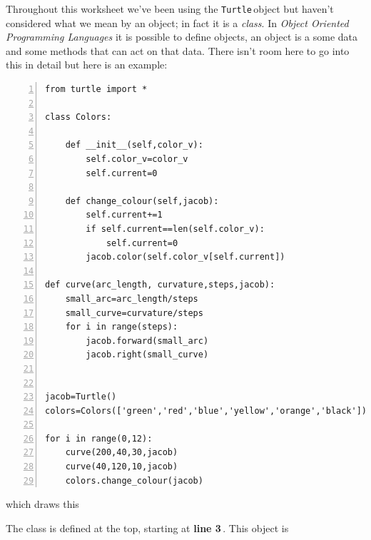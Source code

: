 \documentclass[11pt,a4paper]{scrartcl}
\newcommand{\turtle}{\texttt{Turtle}\,}
\newcommand{\lnn}[1]{\textbf{line #1}\,}
\begin{document}
Throughout this worksheet we've been using the \turtle object but
haven't considered what we mean by an object; in fact it is a
\textsl{class}. In \textsl{Object Oriented Programming Languages} it
is possible to define objects, an object is a some data and some
methods that can act on that data. There isn't room here to go into
this in detail but here is an example:
\begin{lstlisting}[numbers=left]
from turtle import *

class Colors:
    
    def __init__(self,color_v):
        self.color_v=color_v
        self.current=0

    def change_colour(self,jacob):
        self.current+=1
        if self.current==len(self.color_v):
            self.current=0
        jacob.color(self.color_v[self.current])

def curve(arc_length, curvature,steps,jacob):
    small_arc=arc_length/steps
    small_curve=curvature/steps
    for i in range(steps):
        jacob.forward(small_arc)
        jacob.right(small_curve)


jacob=Turtle()
colors=Colors(['green','red','blue','yellow','orange','black'])

for i in range(0,12):
    curve(200,40,30,jacob)
    curve(40,120,10,jacob)
    colors.change_colour(jacob)
\end{lstlisting}
which draws this
\begin{center}
\end{center}
The class is defined at the top, starting at \lnn{3}. This object is
\end{document}
